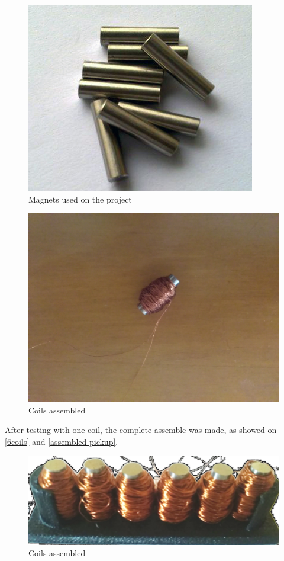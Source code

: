 \begin{figure}[!htpb]
  \centering
  \caption{Magnets used on the project}
  \label{magnets}
  \includegraphics[scale=0.3]{images/magnets}
\end{figure}

\begin{figure}[!htpb]
  \centering
  \caption{Coils assembled}
  \label{coils}
  \includegraphics[scale=0.08]{images/coils}
\end{figure}

After testing with one coil, the complete assemble was made, as showed on \autoref{6coils}
and \autoref{assembled-pickup}.

\begin{figure}[!htpb]
  \centering
  \caption{Coils assembled}
  \label{6coils}
  \includegraphics[scale=0.08]{images/6coils}
\end{figure}

